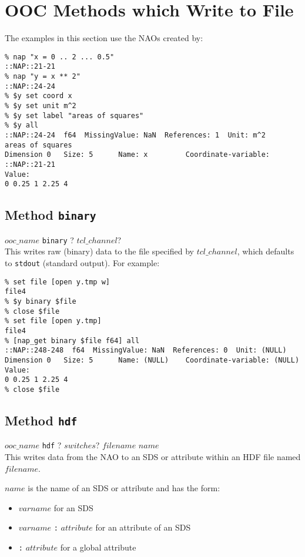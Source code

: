     \section{OOC Methods which Write to File}

The examples in this section use the NAOs created by:
  \begin{verbatim}
% nap "x = 0 .. 2 ... 0.5"
::NAP::21-21
% nap "y = x ** 2"
::NAP::24-24
% $y set coord x
% $y set unit m^2
% $y set label "areas of squares"
% $y all
::NAP::24-24  f64  MissingValue: NaN  References: 1  Unit: m^2
areas of squares
Dimension 0   Size: 5      Name: x         Coordinate-variable:
::NAP::21-21
Value:
0 0.25 1 2.25 4
\end{verbatim}

  \subsection{
    \label{binary}Method \texttt{binary}
  }

  


  $ooc\_name$ 
  \texttt{binary} ?
  $tcl\_channel$?
  \\
  

This writes raw (binary) data to the file specified by 
  $tcl\_channel$, which defaults to 
  \texttt{stdout} (standard output). For example:
  \begin{verbatim}
% set file [open y.tmp w]
file4
% $y binary $file
% close $file
% set file [open y.tmp]
file4
% [nap_get binary $file f64] all
::NAP::248-248  f64  MissingValue: NaN  References: 0  Unit: (NULL)
Dimension 0   Size: 5      Name: (NULL)    Coordinate-variable: (NULL)
Value:
0 0.25 1 2.25 4
% close $file
\end{verbatim}

  \subsection{
    \label{hdf}Method \texttt{hdf}
  }

  


  $ooc\_name$ 
  \texttt{hdf} ?
  $switches$? 
  $filename$ 
  $name$
  \\
  

This writes data from the NAO to an SDS or attribute within an HDF
  file named 
  $filename$.
  


  $name$ is the name of an SDS or attribute and has the
  form:
  \begin{itemize}
    \item 
    $varname$ for an SDS
    \item 
    $varname$
    \texttt{:}
    $attribute$ for an attribute of an SDS
    \item 
    \texttt{:}
    $attribute$ for a global attribute
    \\
  \end{itemize}
  


